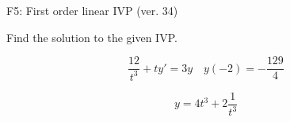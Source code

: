 \begin{exercise}
  \begin{exerciseTitle}F5: First order linear IVP (ver. 34)\end{exerciseTitle}
  \begin{exerciseStatement}
    
Find the solution to the given IVP.

    
\[\frac{12}{t^{3}} +ty'= 3 y \hspace{1em} y( -2 ) = -\frac{129}{4}\]

  \end{exerciseStatement}
  \begin{exerciseAnswer}
    
\[y= 4 t^ 3 +2 \frac{1}{t^{3}}\]

  \end{exerciseAnswer}
\end{exercise}